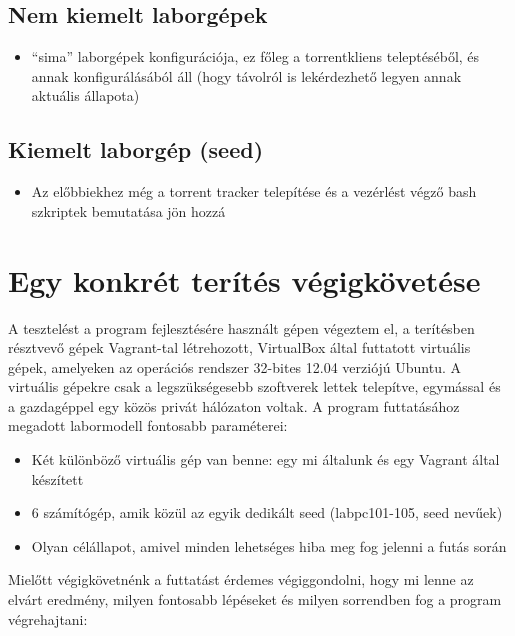 %
\subsection{Nem kiemelt laborgépek}
%

\begin{itemize}
  \item ``sima'' laborgépek konfigurációja, ez főleg a torrentkliens teleptéséből, és annak konfigurálásából áll (hogy távolról is lekérdezhető legyen annak aktuális állapota)
\end{itemize}

%
\subsection{Kiemelt laborgép (seed)}
%

\begin{itemize}
  \item Az előbbiekhez még a torrent tracker telepítése és a vezérlést végző bash szkriptek bemutatása jön hozzá
\end{itemize}


\section{Egy konkrét terítés végigkövetése}

A tesztelést a program fejlesztésére használt gépen végeztem el, a terítésben résztvevő gépek Vagrant-tal létrehozott, VirtualBox\cite{virtualbox} által futtatott virtuális gépek, amelyeken az operációs rendszer 32-bites 12.04 verziójú Ubuntu\cite{ubuntu}. A virtuális gépekre csak a legszükségesebb szoftverek lettek telepítve, egymással és a gazdagéppel egy közös privát hálózaton voltak. A program futtatásához megadott labormodell fontosabb paraméterei:

\begin{itemize}
  \item Két különböző virtuális gép van benne: egy mi általunk és egy Vagrant által készített
  \item 6 számítógép, amik közül az egyik dedikált seed (labpc101-105, seed nevűek)
  \item Olyan célállapot, amivel minden lehetséges hiba meg fog jelenni a futás során
\end{itemize}

Mielőtt végigkövetnénk a futtatást érdemes végiggondolni, hogy mi lenne az elvárt eredmény, milyen fontosabb lépéseket és milyen sorrendben fog a program végrehajtani:

